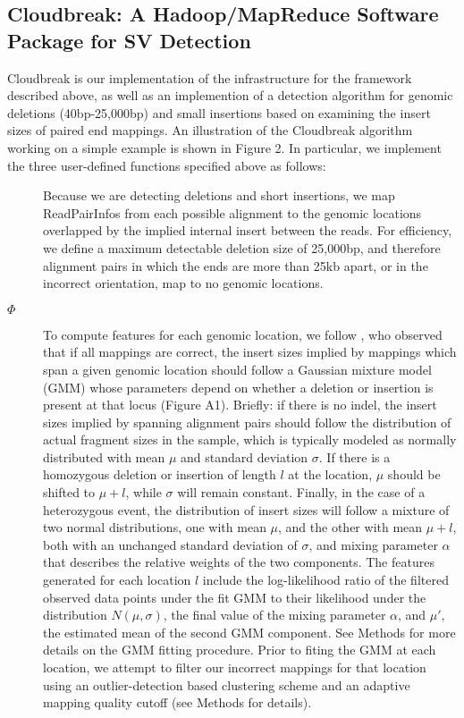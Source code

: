 \documentclass[10pt]{bmc_article}
\newenvironment{bmcformat}{\fussy\setboolean{publ}{true}}{\fussy}
\begin{document}
\begin{bmcformat}
\subsection*{Cloudbreak: A Hadoop/MapReduce Software Package for SV Detection}

Cloudbreak is our implementation of the infrastructure for the framework described above, as well as an implemention of a detection algorithm for genomic deletions (40bp-25,000bp) and small insertions based on examining the insert sizes of paired end mappings. An illustration of the Cloudbreak algorithm working on a simple example is shown in Figure 2. In particular, we implement the three user-defined functions specified above as follows:

\begin{description}
\item[] Because we are detecting deletions and short insertions, we map ReadPairInfos from each possible alignment to the genomic locations overlapped by the implied internal insert between the reads. For efficiency, we define a maximum detectable deletion size of 25,000bp, and therefore alignment pairs in which the ends are more than 25kb apart, or in the incorrect orientation, map to no genomic locations.
\item[$\Phi$] To compute features for each genomic location, we follow \cite{Lee:2009da}, who observed that if all mappings are correct, the insert sizes implied by mappings which span a given genomic location should follow a Gaussian mixture model (GMM) whose parameters depend on whether a deletion or insertion is present at that locus (Figure A1). Briefly: if there is no indel, the insert sizes implied by spanning alignment pairs should follow the distribution of actual fragment sizes in the sample, which is typically modeled as normally distributed with mean $\mu$ and standard deviation $\sigma$. If there is a homozygous deletion or insertion of length $l$ at the location, $\mu$ should be shifted to $\mu + l$, while $\sigma$ will remain constant. Finally, in the case of a heterozygous event, the distribution of insert sizes will follow a mixture of two normal distributions, one with mean $\mu$, and the other with mean $\mu + l$, both with an unchanged standard deviation of $\sigma$, and mixing parameter $\alpha$ that describes the relative weights of the two components. The features generated for each location $l$ include the log-likelihood ratio of the filtered observed data points under the fit GMM to their likelihood under the distribution $N(\mu,\sigma)$, the final value of the mixing parameter $\alpha$, and $\mu'$, the estimated mean of the second GMM component. See Methods for more details on the GMM fitting procedure. Prior to fiting the GMM at each location, we attempt to filter our incorrect mappings for that location using an outlier-detection based clustering scheme and an adaptive mapping quality cutoff (see Methods for details).


\end{description}
\end{bmcformat}
\end{document}
